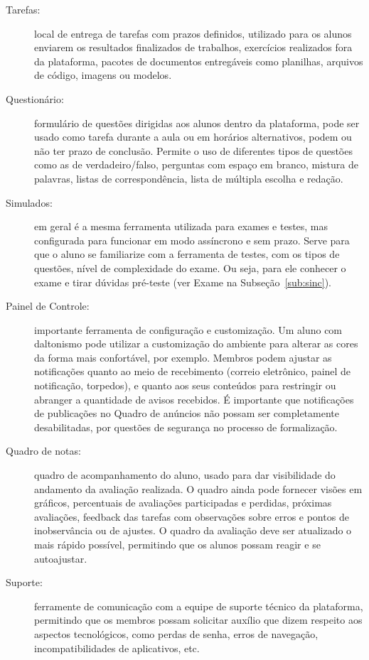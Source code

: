 \begin{description}
\item[Tarefas:] local de entrega de tarefas com prazos definidos, utilizado para os alunos enviarem os resultados finalizados de trabalhos, exercícios realizados fora da plataforma, pacotes de documentos entregáveis como planilhas, arquivos de código, imagens ou modelos. 
\item[Questionário:] formulário de questões dirigidas aos alunos dentro da plataforma, pode ser usado como tarefa durante a aula ou em horários alternativos, podem ou não ter prazo de conclusão. Permite o uso de diferentes tipos de questões como as de verdadeiro/falso, perguntas com espaço em branco, mistura de palavras, listas de correspondência, lista de múltipla escolha e redação.  
\item[Simulados:] em geral é a mesma ferramenta utilizada para exames e testes, mas configurada para funcionar em modo assíncrono e sem prazo. Serve para que o aluno se familiarize com a ferramenta de testes, com os tipos de questões, nível de complexidade do exame. Ou seja, para ele conhecer o exame e tirar dúvidas pré-teste (ver Exame na Subseção~\ref{sub:sinc}).
\item[Painel de Controle:] importante ferramenta de configuração e customização. Um aluno com daltonismo pode utilizar a customização do ambiente para alterar as cores da forma mais confortável, por exemplo. Membros podem ajustar as notificações quanto ao meio de recebimento (correio eletrônico, painel de notificação, torpedos), e quanto aos seus conteúdos para restringir ou abranger a quantidade de avisos recebidos. É importante que notificações de publicações no Quadro de anúncios não possam ser completamente desabilitadas, por questões de segurança no processo de formalização.
\item[Quadro de notas:] quadro de acompanhamento do aluno, usado para dar visibilidade do andamento da avaliação realizada. O quadro ainda pode fornecer visões em gráficos, percentuais de avaliações participadas e perdidas, próximas avaliações, feedback das tarefas com observações sobre erros e pontos de inobservância ou de ajustes. O quadro da avaliação deve ser atualizado o mais rápido possível, permitindo que os alunos possam reagir e se autoajustar.
\item[Suporte:] ferramente de comunicação com a equipe de suporte técnico da plataforma, permitindo que os membros possam solicitar auxílio que dizem respeito aos aspectos tecnológicos, como perdas de senha, erros de navegação, incompatibilidades de aplicativos, etc.

\end{description}
